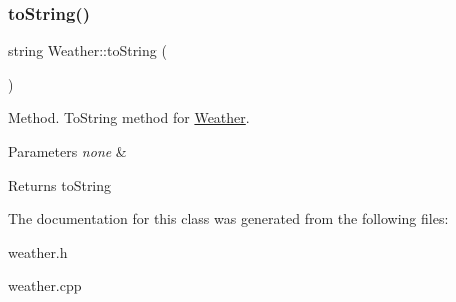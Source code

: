 \subsubsection{\texorpdfstring{to\+String()}{toString()}}
{\footnotesize\ttfamily string Weather\+::to\+String (\begin{DoxyParamCaption}{ }\end{DoxyParamCaption})}

Method. To\+String method for \hyperlink{class_weather}{Weather}. 
\begin{DoxyParams}{Parameters}
{\em none} & \\
\hline
\end{DoxyParams}
\begin{DoxyReturn}{Returns}
to\+String 
\end{DoxyReturn}


The documentation for this class was generated from the following files\+:\begin{DoxyCompactItemize}
\item 
weather.\+h\item 
weather.\+cpp\end{DoxyCompactItemize}

